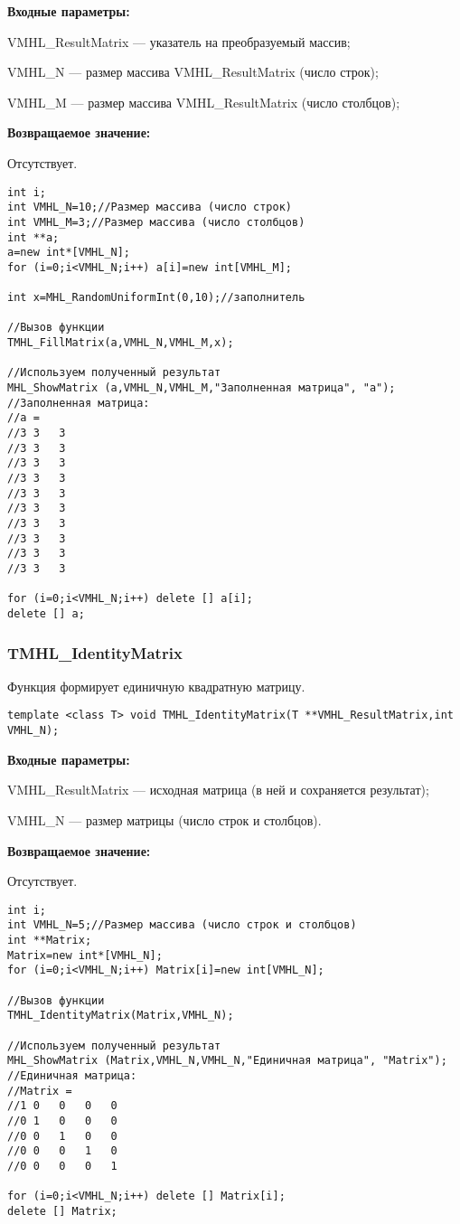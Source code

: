 \documentclass[a4paper,12pt]{article}
\begin{document}
\textbf{Входные параметры:}

 VMHL\_ResultMatrix --- указатель на преобразуемый массив;
 
 VMHL\_N --- размер массива VMHL\_ResultMatrix (число строк);
 
 VMHL\_M --- размер массива VMHL\_ResultMatrix (число столбцов);

\textbf{Возвращаемое значение:}

Отсутствует.


\begin{lstlisting}[label=code_use_TMHL_FillMatrix,caption=Пример использования]
int i;
int VMHL_N=10;//Размер массива (число строк)
int VMHL_M=3;//Размер массива (число столбцов)
int **a;
a=new int*[VMHL_N];
for (i=0;i<VMHL_N;i++) a[i]=new int[VMHL_M];

int x=MHL_RandomUniformInt(0,10);//заполнитель

//Вызов функции
TMHL_FillMatrix(a,VMHL_N,VMHL_M,x);

//Используем полученный результат
MHL_ShowMatrix (a,VMHL_N,VMHL_M,"Заполненная матрица", "a");
//Заполненная матрица:
//a =	
//3	3	3
//3	3	3
//3	3	3
//3	3	3
//3	3	3
//3	3	3
//3	3	3
//3	3	3
//3	3	3
//3	3	3

for (i=0;i<VMHL_N;i++) delete [] a[i];
delete [] a;
\end{lstlisting}

\subsubsection{TMHL\_IdentityMatrix}\label{TMHL_IdentityMatrix}

Функция формирует единичную квадратную матрицу.


\begin{lstlisting}[label=code_syntax_TMHL_IdentityMatrix,caption=Синтаксис]
template <class T> void TMHL_IdentityMatrix(T **VMHL_ResultMatrix,int VMHL_N);
\end{lstlisting}

\textbf{Входные параметры:}  
 
VMHL\_ResultMatrix --- исходная матрица (в ней и сохраняется результат);
 
VMHL\_N --- размер матрицы (число строк и столбцов).

\textbf{Возвращаемое значение:}

Отсутствует.


\begin{lstlisting}[label=code_use_TMHL_IdentityMatrix,caption=Пример использования]
int i;
int VMHL_N=5;//Размер массива (число строк и столбцов)
int **Matrix;
Matrix=new int*[VMHL_N];
for (i=0;i<VMHL_N;i++) Matrix[i]=new int[VMHL_N];

//Вызов функции
TMHL_IdentityMatrix(Matrix,VMHL_N);

//Используем полученный результат
MHL_ShowMatrix (Matrix,VMHL_N,VMHL_N,"Единичная матрица", "Matrix");
//Единичная матрица:
//Matrix =
//1	0	0	0	0
//0	1	0	0	0
//0	0	1	0	0
//0	0	0	1	0
//0	0	0	0	1

for (i=0;i<VMHL_N;i++) delete [] Matrix[i];
delete [] Matrix;
\end{lstlisting}
\end{document}
